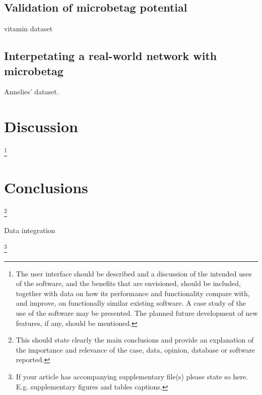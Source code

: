 \documentclass[sn-mathphys,Numbered]{sn-jnl}%
\theoremstyle{thmstyleone}%
\theoremstyle{thmstyletwo}%
\theoremstyle{thmstylethree}%
\begin{document}
    \subsection*{Validation of microbetag potential}
        \label{subsec:validation}


        vitamin dataset~\cite{hessler2023vitamin}


    \subsection*{Interpetating a real-world network with microbetag}
        \label{subsec:usecase}


        Annelies' dataset. 










\section{Discussion}
    \label{sec:discussion}
    \footnote{
        The user interface should be described and a discussion of the intended uses of the software, and the benefits that are envisioned, should be included, 
        together with data on how its performance and functionality compare with, and improve, on functionally similar existing software. 
        A case study of the use of the software may be presented. The planned future development of new features, if any, should be mentioned.
    }
    




\section{Conclusions}
    \label{sec:conclusions}
    \footnote{
        This should state clearly the main conclusions and provide an explanation of the importance and relevance of the case, data, opinion, database or software reported.
    }

    Data integration 


\backmatter





    \label{supplementary-files}
    \footnote{
        If your article has accompanying supplementary file(s) please state so here.
        E.g. supplementary figures and tables captions. 
    }
\end{document}
